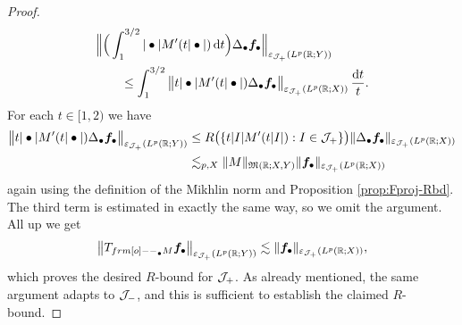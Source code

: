 \begin{proof}
\begin{equation*}
  \begin{aligned}
    &\Big\| \Big( \int_{1}^{3/2} |\bullet|  M'(t|\bullet|) \, \mathrm{d} t \Big)\Delta_{\bullet} \bm{f}_{\bullet} \Big\|_{\varepsilon_{\mathcal{J}_{+}}(L^p(\mathbb{R};Y))} \\
    &\qquad \leq \int_{1}^{3/2} \big\| t|\bullet|  M'(t|\bullet|)\Delta_{\bullet} \bm{f}_{\bullet} \big\|_{\varepsilon_{\mathcal{J}_{+}}(L^p(\mathbb{R};X))} \, \frac{\mathrm{d} t}{t}.
  \end{aligned}
\end{equation*}
For each $t \in [1,2)$ we have
\begin{equation*}
  \begin{aligned}
    \big\| t|\bullet|  M'(t|\bullet|)\Delta_{\bullet} \bm{f}_{\bullet} \big\|_{\varepsilon_{\mathcal{J}_{+}}(L^p(\mathbb{R};Y))} 
    &\leq R\big( \{ t|I|  M'(t|I|) : I \in \mathcal{J}_{+}\} \big) \| \Delta_{\bullet} \bm{f}_{\bullet} \|_{\varepsilon_{\mathcal{J}_{+}}(L^p(\mathbb{R};X))} \\
    &\lesssim_{p,X} \|M\|_{\mathfrak{M}(\mathbb{R};X,Y)} \| \bm{f}_{\bullet} \|_{\varepsilon_{\mathcal{J}_{+}}(L^p(\mathbb{R};X))}
  \end{aligned}
\end{equation*}
again using the definition of the Mikhlin norm and Proposition \ref{prop:Fproj-Rbd}.
The third term is estimated in exactly the same way, so we omit the argument.
All up we get
\begin{equation*}
  \begin{aligned}
    \big\|T_{\1_{\bullet} M} \mb{f}_{\bullet} \big\|_{\varepsilon_{\mc{J}_{+}}(L^p(\R;Y))}
    \lesssim \|\mb{f}_{\bullet} \|_{\varepsilon_{\mc{J}_{+}}(L^p(\R;X))},
  \end{aligned}
\end{equation*}
which proves the desired $R$-bound for $\mathcal{J}_{+}$.
As already mentioned, the same argument adapts to $\mathcal{J}_{-}$, and this is sufficient to establish the claimed $R$-bound.
\end{proof}

